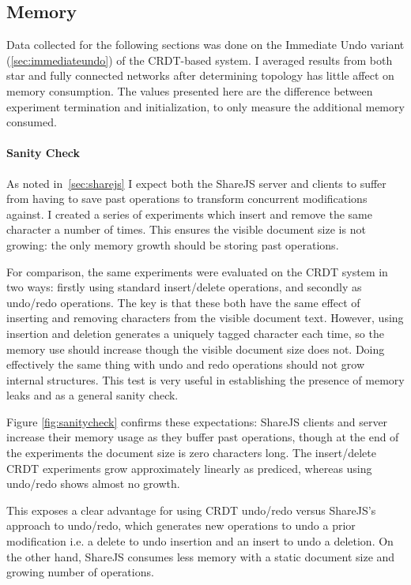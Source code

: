 \documentclass[12pt,a4paper,twoside,openright]{report}
\begin{document}
		
			
		\subsection{Memory}
			Data collected for the following sections was done on the Immediate Undo variant (\cref{sec:immediateundo}) of the CRDT-based system. I averaged results from both star and fully connected networks after determining topology has little affect on memory consumption. The values presented here are the difference between experiment termination and initialization, to only measure the additional memory consumed.
		
			\paragraph{Sanity Check} \label{sec:sanitycheck}
				As noted in~\cref{sec:sharejs} I expect both the ShareJS server and clients to suffer from having to save past operations to transform concurrent modifications against. I created a series of experiments which insert and remove the same character a number of times. This ensures the visible document size is not growing: the only memory growth should be storing past operations. 
				
				For comparison, the same experiments were evaluated on the CRDT system in two ways: firstly using standard insert/delete operations, and secondly as undo/redo operations. The key is that these both have the same effect of inserting and removing characters from the visible document text. However, using insertion and deletion generates a uniquely tagged character each time, so the memory use should increase though the visible document size does not. Doing effectively the same thing with undo and redo operations should not grow internal structures. This test is very useful in establishing the presence of memory leaks and as a general sanity check.
				
				Figure \ref{fig:sanitycheck} confirms these expectations: ShareJS clients and server increase their memory usage as they buffer past operations, though at the end of the experiments the document size is zero characters long. The insert/delete CRDT experiments grow approximately linearly as prediced, whereas using undo/redo shows almost no growth. 
				
				This exposes a clear advantage for using CRDT undo/redo versus ShareJS's approach to undo/redo, which generates new operations to undo a prior modification i.e. a delete to undo insertion and an insert to undo a deletion. On the other hand, ShareJS consumes less memory with a static document size and growing number of operations.
				
\end{document}
